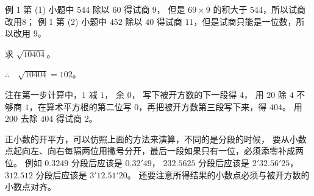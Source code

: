 \zhuyi
例 1 第 (1) 小题中 $544$ 除以 $60$ 得试商 $9$， 但是 $69 \times 9$ 的积大于 $544$，所以试商改用8；
例 1 第 (2) 小题中 $452$ 除以 $40$ 得试商 $11$，但是试商只能是一位数，所以改用 $9$。


\liti 求 $\sqrt{10404}$。

\jie \hspace*{2em} 

$\therefore \quad \sqrt{10404} = 102$。


\zhuyi 注在第一步计算中，$1$ 减 $1$， 余 $0$， 写下被开方数的下一段得 $4$，
用 $20$ 除 $4$ 不够商 $1$，在算术平方根的第二位写 $0$，再把被开方数第三段写下来，得 $404$。
用 $200$ 去除 $404$ 得试商 $2$。

正小数的开平方，可以仿照上面的方法来演算，不同的是分段的时候，
要从小数点起向左、向右每隔两位用撇号分开，最后一段如果只有一位，必须添零补成两位。
例如 $0.3249$ 分段后应该是 $0.32'49$，
$232.5625$ 分段后应该是 $2'32.56'25$，
$312.512$ 分段后应该是 $3'12.51'20$。
还要注意所得结果的小数点必须与被开方数的小数点对齐。


